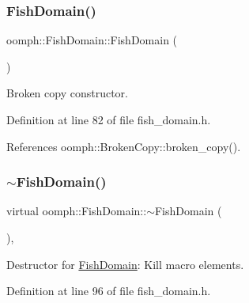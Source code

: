 \mbox{\label{classoomph_1_1FishDomain_a9436a46493f270e194b1cff950c6670e}} 
\subsubsection{\texorpdfstring{Fish\+Domain()}{FishDomain()}\hspace{0.1cm}{\footnotesize\ttfamily [2/2]}}
{\footnotesize\ttfamily oomph\+::\+Fish\+Domain\+::\+Fish\+Domain (\begin{DoxyParamCaption}\item[{const \hyperlink{classoomph_1_1FishDomain}{Fish\+Domain} \&}]{ }\end{DoxyParamCaption})\hspace{0.3cm}{\ttfamily [inline]}}



Broken copy constructor. 



Definition at line 82 of file fish\+\_\+domain.\+h.



References oomph\+::\+Broken\+Copy\+::broken\+\_\+copy().

\mbox{\label{classoomph_1_1FishDomain_ab51c01c611efba9f940409e5154c9cd0}} 
\subsubsection{\texorpdfstring{$\sim$\+Fish\+Domain()}{~FishDomain()}}
{\footnotesize\ttfamily virtual oomph\+::\+Fish\+Domain\+::$\sim$\+Fish\+Domain (\begin{DoxyParamCaption}{ }\end{DoxyParamCaption})\hspace{0.3cm}{\ttfamily [inline]}, {\ttfamily [virtual]}}



Destructor for \hyperlink{classoomph_1_1FishDomain}{Fish\+Domain}\+: Kill macro elements. 



Definition at line 96 of file fish\+\_\+domain.\+h.




